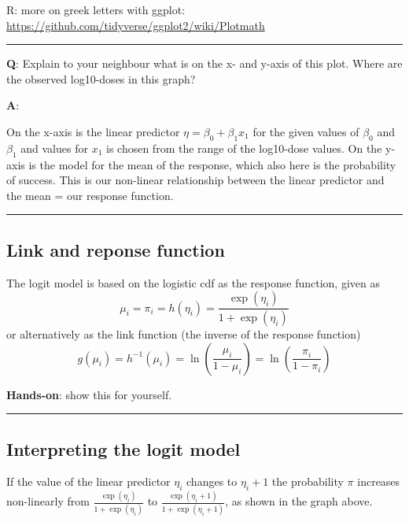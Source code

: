 \documentclass[
]{article}
\begin{document}
R: more on greek letters with ggplot:
\url{https://github.com/tidyverse/ggplot2/wiki/Plotmath}

\begin{center}\rule{0.5\linewidth}{0.5pt}\end{center}

\textbf{Q}: Explain to your neighbour what is on the x- and y-axis of
this plot. Where are the observed log10-doses in this graph?

\textbf{A}:

On the x-axis is the linear predictor \(\eta=\beta_0+\beta_1 x_1\) for
the given values of \(\beta_0\) and \(\beta_1\) and values for \(x_1\)
is chosen from the range of the log10-dose values. On the y-axis is the
model for the mean of the response, which also here is the probability
of success. This is our non-linear relationship between the linear
predictor and the mean = our response function.

\begin{center}\rule{0.5\linewidth}{0.5pt}\end{center}

\hypertarget{link-and-reponse-function}{%
\subsection{Link and reponse function}\label{link-and-reponse-function}}

The logit model is based on the logistic cdf as the response function,
given as \[ \mu_i=\pi_i=h(\eta_i)=\frac{\exp(\eta_i)}{1+\exp(\eta_i)}\]
or alternatively as the link function (the inverse of the response
function)
\[ g(\mu_i)=h^{-1}(\mu_i)=\ln(\frac{\mu_i}{1-\mu_i})=\ln(\frac{\pi_i}{1-\pi_i})\]

\textbf{Hands-on}: show this for yourself.

\begin{center}\rule{0.5\linewidth}{0.5pt}\end{center}

\hypertarget{interpreting-the-logit-model}{%
\subsection{Interpreting the logit
model}\label{interpreting-the-logit-model}}

If the value of the linear predictor \(\eta_i\) changes to \(\eta_i+1\)
the probability \(\pi\) increases non-linearly from
\(\frac{\exp(\eta_i)}{1+\exp(\eta_i)}\) to
\(\frac{\exp(\eta_i+1)}{1+\exp(\eta_i+1)}\), as shown in the graph
above.
\end{document}
